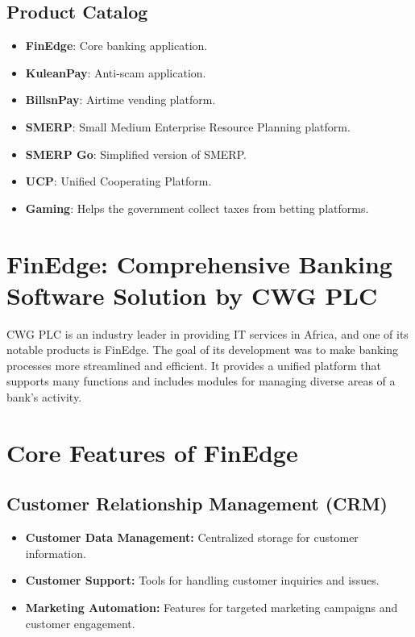\documentclass[a4paper,12pt]{report}
\begin{document}
		\subsection{Product Catalog}
	\begin{itemize}
		\item \textbf{FinEdge}: Core banking application.
		\item \textbf{KuleanPay}: Anti-scam application.
		\item \textbf{BillsnPay}: Airtime vending platform.
		\item \textbf{SMERP}: Small Medium Enterprise Resource Planning platform.
		\item \textbf{SMERP Go}: Simplified version of SMERP.
		\item \textbf{UCP}: Unified Cooperating Platform.
		\item \textbf{Gaming}: Helps the government collect taxes from betting platforms.
	\end{itemize}
	
	\section{FinEdge: Comprehensive Banking Software Solution by CWG PLC}
	CWG PLC is an industry leader in providing IT services in Africa, and one of its notable products is FinEdge. The goal of its development was to make banking processes more streamlined and efficient. It provides a unified platform that supports many functions and includes modules for managing diverse areas of a bank's activity.
	
	\section{Core Features of FinEdge}
	
	\subsection{Customer Relationship Management (CRM)}
	\begin{itemize}
		\item \textbf{Customer Data Management:} Centralized storage for customer information.
		\item \textbf{Customer Support:} Tools for handling customer inquiries and issues.
		\item \textbf{Marketing Automation:} Features for targeted marketing campaigns and customer engagement.
	\end{itemize}
	
\end{document}

